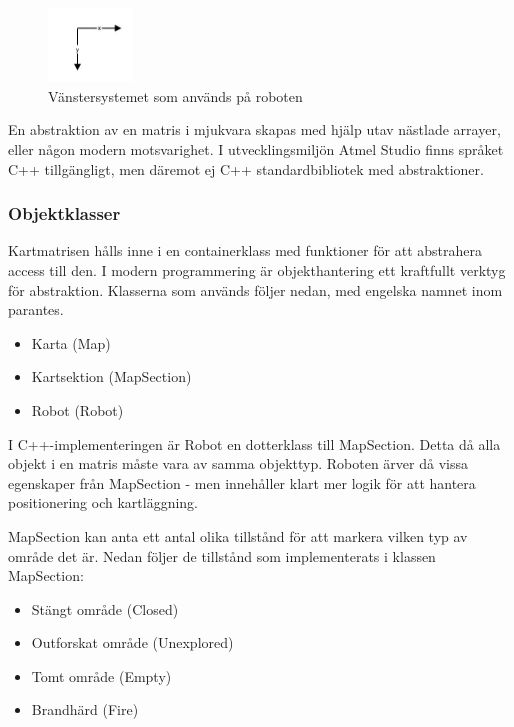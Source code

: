 \documentclass[a4paper,12pt,fleqn]{article}
\begin{document}
\begin{figure}[htp] %
  \begin{center}
  \includegraphics[keepaspectratio=true,width=0.2\textwidth]{coor.jpg}  %
  \end{center}
  \caption{Vänstersystemet som används på roboten} %
  \label{fig:coor}
\end{figure}

En abstraktion av en matris i mjukvara skapas med hjälp utav nästlade arrayer, eller någon modern motsvarighet. I utvecklingsmiljön Atmel Studio finns språket C++ tillgängligt, men däremot ej C++ standardbibliotek med abstraktioner.

\subsubsection{Objektklasser}

Kartmatrisen hålls inne i en containerklass med funktioner för att abstrahera access till den. I modern programmering är objekthantering ett kraftfullt verktyg för abstraktion. Klasserna som används följer nedan, med engelska namnet inom parantes.

\begin{itemize}
	\item Karta (Map)
	\item Kartsektion (MapSection)
	\item Robot (Robot)
\end{itemize}

I C++-implementeringen är Robot en dotterklass till MapSection. Detta då alla objekt i en matris måste vara av samma objekttyp. Roboten ärver då vissa egenskaper från MapSection - men innehåller klart mer logik för att hantera positionering och kartläggning. 

MapSection kan anta ett antal olika tillstånd för att markera vilken typ av område det är. Nedan följer de tillstånd som implementerats i klassen MapSection: 

\begin{itemize}
	\item Stängt område (Closed)
	\item Outforskat område (Unexplored)
	\item Tomt område (Empty)
	\item Brandhärd (Fire)
\end{itemize}
\end{document}
